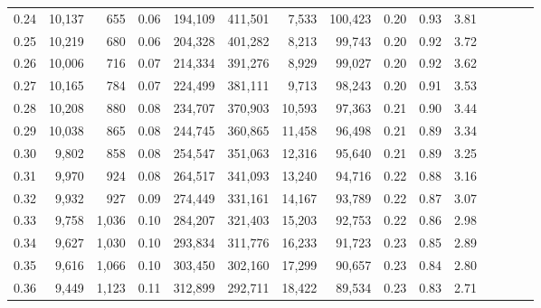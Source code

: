 \begin{tabular}{rrrcrrrrrrrrrrr}
0.24 &  10,137 &    655 &                                       0.06 &  194,109 &  411,501 &    7,533 &  100,423 &  0.20 &  0.93 &                         3.81 \\
0.25 &  10,219 &    680 &                                       0.06 &  204,328 &  401,282 &    8,213 &   99,743 &  0.20 &  0.92 &                         3.72 \\
0.26 &  10,006 &    716 &                                       0.07 &  214,334 &  391,276 &    8,929 &   99,027 &  0.20 &  0.92 &                         3.62 \\
0.27 &  10,165 &    784 &                                       0.07 &  224,499 &  381,111 &    9,713 &   98,243 &  0.20 &  0.91 &                         3.53 \\
0.28 &  10,208 &    880 &                                       0.08 &  234,707 &  370,903 &   10,593 &   97,363 &  0.21 &  0.90 &                         3.44 \\
0.29 &  10,038 &    865 &                                       0.08 &  244,745 &  360,865 &   11,458 &   96,498 &  0.21 &  0.89 &                         3.34 \\
0.30 &   9,802 &    858 &                                       0.08 &  254,547 &  351,063 &   12,316 &   95,640 &  0.21 &  0.89 &                         3.25 \\
0.31 &   9,970 &    924 &                                       0.08 &  264,517 &  341,093 &   13,240 &   94,716 &  0.22 &  0.88 &                         3.16 \\
0.32 &   9,932 &    927 &                                       0.09 &  274,449 &  331,161 &   14,167 &   93,789 &  0.22 &  0.87 &                         3.07 \\
0.33 &   9,758 &  1,036 &                                       0.10 &  284,207 &  321,403 &   15,203 &   92,753 &  0.22 &  0.86 &                         2.98 \\
0.34 &   9,627 &  1,030 &                                       0.10 &  293,834 &  311,776 &   16,233 &   91,723 &  0.23 &  0.85 &                         2.89 \\
0.35 &   9,616 &  1,066 &                                       0.10 &  303,450 &  302,160 &   17,299 &   90,657 &  0.23 &  0.84 &                         2.80 \\
0.36 &   9,449 &  1,123 &                                       0.11 &  312,899 &  292,711 &   18,422 &   89,534 &  0.23 &  0.83 &                         2.71 \\

\end{tabular}
